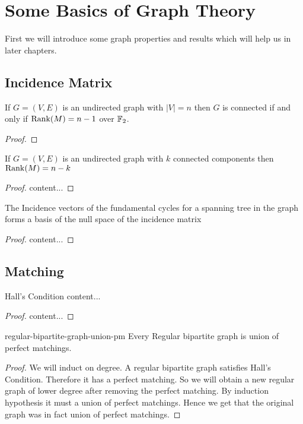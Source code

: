 \chapter{Some Basics of Graph Theory}
First we will introduce some graph properties and results which will help us in later chapters.
\section{Incidence Matrix}
\begin{Theorem}{}{}
	If $G=(V,E)$ is an undirected graph with $|V|=n$ then $G$ is connected if and only if $\operatorname{Rank}(M)=n-1$ over $\mathbb{F}_2$.
\end{Theorem}
\begin{proof}
\end{proof}
\begin{corolary}{}{}
	If $G=(V,E)$ is an undirected graph with $k$ connected components then $\operatorname{Rank}(M)=n-k$
\end{corolary}
\begin{proof}
	content...
\end{proof}
\begin{Theorem}{}{}
	The Incidence vectors of the  fundamental cycles for a spanning tree in the graph forms a basis of the null space of the incidence matrix
\end{Theorem}
\begin{proof}
	content...
\end{proof}
\section{Matching}
\begin{Theorem}{Hall's Condition}{}
	content...
\end{Theorem}
\begin{proof}
	content...
\end{proof}
\begin{lemma}{}{regular-bipartite-graph-union-pm}
	Every Regular bipartite graph is  union of perfect matchings.
\end{lemma}
\begin{proof}
	We will induct on degree. A regular bipartite graph satisfies Hall's Condition. Therefore it has a perfect matching. So we will obtain a new regular graph of lower degree after removing the perfect matching. By induction hypothesis it must a union of perfect matchings. Hence we get that the original graph was in fact union of perfect matchings.
\end{proof}
